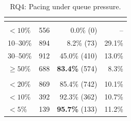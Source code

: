 \begin{table}[t]
  \centering
  \setlength{\abovecaptionskip}{2pt}%
  \setlength{\belowcaptionskip}{3pt}%
  \caption{RQ4: Pacing under queue pressure.}
  \label{tab:rq4_pacing_sizing}

  {\scriptsize
  \renewcommand{\arraystretch}{1.08}%
  \setlength{\tabcolsep}{8pt}%
  \begin{tabular}{@{}%
      >{\raggedright\arraybackslash}p{62pt}|%
      r|r|r%
    @{}}
    \toprule
      & 
      & 
      &  \\
    \midrule

     \\
    \addlinespace[1pt]
    \hspace{4pt}\(<10\%\)     & 556 &  \phantom{0}0.0\% \phantom{00}(0) &    --  \\
    \hspace{4pt}10--30\%      & 894 &  \phantom{0}8.2\% \phantom{0}(73)  & 29.1\% \\
    \hspace{4pt}30--50\%      & 912 &           45.0\% (410)             & 13.0\% \\
    \hspace{4pt}\(\geq 50\%\) & 688 &  \textbf{83.4\%} (574)             &  8.3\% \\
    \midrule

     \\
    \addlinespace[1pt]
    \hspace{4pt}\(<20\%\)     & 869 & 85.4\% (742)          & 10.1\% \\
    \hspace{4pt}\(<10\%\)     & 392 & 92.3\% (362)          & 10.7\% \\
    \hspace{4pt}\(<5\%\)      & 139 & \textbf{95.7\%} (133) & 11.2\% \\
    \bottomrule
  \end{tabular}%
  }
\end{table}
